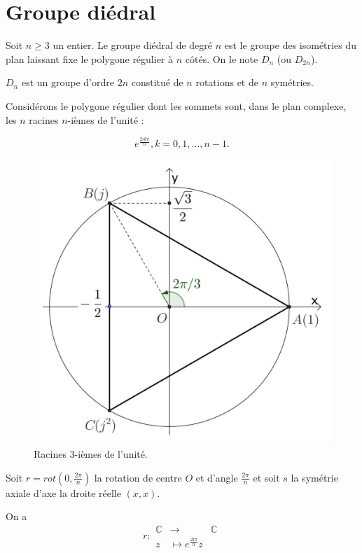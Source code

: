 \documentclass[french]{book}
\begin{document}

\section{Groupe diédral}

Soit $n \geq 3$ un entier. Le groupe diédral de degré $n$ est le groupe des isométries du plan laissant fixe le polygone régulier à $n$ côtés. On le note $D_n$ (ou $D _{2n}$).

$D_n$ est un groupe d'ordre $2n$ constitué de $n$ rotations et de $n$ symétries.

Considérons le polygone régulier dont les sommets sont, dans le plan complexe, les $n$ racines $n$-ièmes de l'unité :

\[
e^{\frac{2ik \pi}{n}}, k = 0, 1, \dots, n-1.
\]

\begin{figure}[h!]
  \centering
  \includegraphics[scale=0.3]{figures/racines-3.jpg}
  \caption{Racines 3-ièmes de l'unité.}
  \label{}
\end{figure}

Soit $r = rot(0, \frac{2 \pi}{n})$ la rotation de centre $O$ et d'angle $\frac{2 \pi}{n}$ et soit $s$ la symétrie axiale d'axe la droite réelle $(x,x)$.

On a \[
r:\begin{array}{rcl}
\mathbb{C} & \longrightarrow & \mathbb{C} \\
z & \longmapsto e^{\frac{2 i \pi}{n}} z
\end{array}
\]
\end{document}
